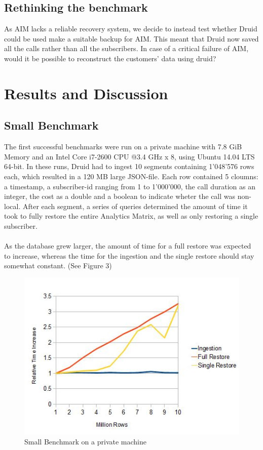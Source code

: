 \documentclass[11pt,singlecolumn]{scrartcl}
\begin{document}
\subsection{Rethinking the benchmark}
As AIM lacks a reliable recovery system, we decide to instead test whether Druid could be used make a suitable backup for AIM. This meant that Druid now saved all the calls rather than all the subscribers. In case of a critical failure of AIM, would it be possible to reconstruct the customers' data using druid?
\clearpage


\section{Results and Discussion}
\subsection{Small Benchmark}The first successful benchmarks were run on a private machine with 7.8 GiB Memory and an Intel Core i7-2600 CPU @3.4 GHz x 8, using Ubuntu 14.04 LTS 64-bit. In these runs, Druid had to ingest 10 segments containing 1'048'576 rows each, which resulted in a 120 MB large JSON-file. Each row contained 5 cloumns: a timestamp, a subscriber-id ranging from 1 to 1'000'000, the call duration as an integer, the cost as a double and a boolean to indicate wheter the call was non-local. After each segment, a series of queries determined the amount of time it took to fully restore the entire Analytics Matrix, as well as only restoring a single subscriber.\\\\
As the database grew larger, the amount of time for a full restore was expected to increase, whereas the time for the ingestion and the single restore should stay somewhat constant. (See Figure 3)

\begin{figure}[h]
\includegraphics{loc.jpg}
\caption{Small Benchmark on a private machine}
\end{figure}
\end{document}
